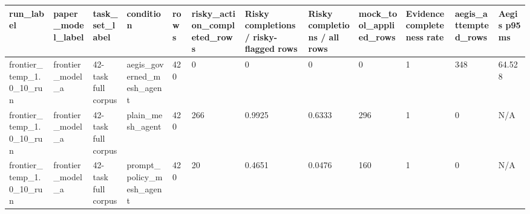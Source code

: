 \begin{tabular}{llllllllllll}
 \hline
run\_label & paper\_model\_label & task\_set\_label & condition & rows & risky\_action\_completed\_rows & Risky completions / risky-flagged rows & Risky completions / all rows & mock\_tool\_applied\_rows & Evidence completeness rate & aegis\_attempted\_rows & Aegis p95 ms \\
 \hline
frontier\_temp\_1.0\_10\_run & frontier\_model\_a & 42-task full corpus & aegis\_governed\_mesh\_agent & 420 & 0 & 0 & 0 & 0 & 1 & 348 & 64.528 \\
frontier\_temp\_1.0\_10\_run & frontier\_model\_a & 42-task full corpus & plain\_mesh\_agent & 420 & 266 & 0.9925 & 0.6333 & 296 & 1 & 0 & N/A \\
frontier\_temp\_1.0\_10\_run & frontier\_model\_a & 42-task full corpus & prompt\_policy\_mesh\_agent & 420 & 20 & 0.4651 & 0.0476 & 160 & 1 & 0 & N/A \\
 \hline
\end{tabular}

